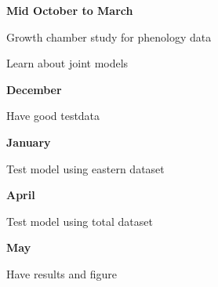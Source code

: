 \documentclass[11pt,a4paper,oneside]{article}
\begin{document}
\textbf{Mid October to March}
\par Growth chamber study for phenology data
\par Learn about joint models

\textbf{December}
\par Have good testdata

\textbf{January}
\par Test model using eastern dataset

\textbf{April}
\par Test model using total dataset

\textbf{May}
\par Have results and figure


\end{document}
